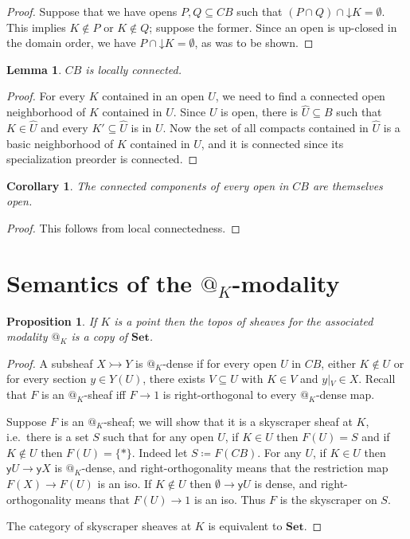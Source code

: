 \documentclass[11pt, oneside, article]{memoir}
\makeatletter
\theoremstyle{plain}
\newtheorem{proposition}[theorem]{Proposition}
\newtheorem{corollary}[theorem]{Corollary}
\newtheorem{lemma}[theorem]{Lemma}
\theoremstyle{definition}
\theoremstyle{remark}
\renewcommand{\ss}{\subseteq}
\newcommand{\Cat}[1]{\mathbf{#1}}
\newcommand{\Fun}[1]{\mathsf{#1}}
\newcommand{\smset}{\Cat{Set}}
\newcommand{\inj}{\rightarrowtail}
\newcommand{\wh}[1]{\widehat{#1}}
\newcommand{\yoneda}{\Fun{y}}
\newcommand{\restrict}[2]{#1\big|\hspace{0in}_{#2}}
\newcommand{\BaseSpace}{B}
\newcommand{\CB}{C\BaseSpace}
\newcommand{\AtSymbol}{{@}}
\newcommand{\At}[2][]{\AtSymbol^{#1}_{#2}}
\newcommand{\down}{\mathord{\downarrow}}
\makeatother
\begin{document}
\begin{proof}
Suppose that we have opens $P,Q\subseteq C\BaseSpace$ such that $(P\cap Q)\cap \down K = \emptyset$. This implies $K\not\in P$ or $K\not\in Q$; suppose the former. Since an open is up-closed in the domain order, we have $P\cap \down K = \emptyset$, as was to be shown.
\end{proof}

\begin{lemma}
	\label{lem.locally_connected}
	$\CB$ is locally connected.
\end{lemma}

\begin{proof}
	For every $K$ contained in an open $U$, we need to find a connected open neighborhood of $K$ contained in $U$. Since $U$ is open, there is $\wh{U} \subseteq \BaseSpace$ such that $K\in\wh{U}$ and every $K'\subseteq \wh{U}$ is in $U$. Now the set of all compacts contained in $\wh{U}$ is a basic neighborhood of $K$ contained in $U$, and it is connected since its specialization preorder is connected.
\end{proof}

\begin{corollary}
	\label{cor.open_components}
	The connected components of every open in $\CB$ are themselves open.
\end{corollary}

\begin{proof}
	This follows from local connectedness.
\end{proof}

\section{Semantics of the $\At{K}$-modality}

\begin{proposition}
If $K$ is a point then the topos of sheaves for the associated modality $\At{K}$ is a copy of $\smset$.
\end{proposition}
\begin{proof}
A subsheaf $X\inj Y$ is $\At{K}$-dense if for every open $U$ in $C\BaseSpace$, either $K\not\in U$ or for every section $y\in Y(U)$, there exists $V\ss U$ with $K\in V$ and $\restrict{y}{V}\in X$. Recall that $F$ is an $\At{K}$-sheaf iff $F\to 1$ is right-orthogonal to every $\At{K}$-dense map.

Suppose $F$ is an $\At{K}$-sheaf; we will show that it is a skyscraper sheaf at $K$, i.e.\ there is a set $S$ such that for any open $U$, if $K\in U$ then $F(U)=S$ and if $K\not\in U$ then $F(U)=\{*\}$. Indeed let $S\coloneqq F(C\BaseSpace)$. For any $U$, if $K\in U$ then $\yoneda U\to\yoneda X$ is $\At{K}$-dense, and right-orthogonality means that the restriction map $F(X)\to F(U)$ is an iso. If $K\not\in U$ then $\emptyset\to\yoneda U$ is dense, and right-orthogonality means that $F(U)\to 1$ is an iso. Thus $F$ is the skyscraper on $S$.

The category of skyscraper sheaves at $K$ is equivalent to $\smset$.
\end{proof}
\end{document}
